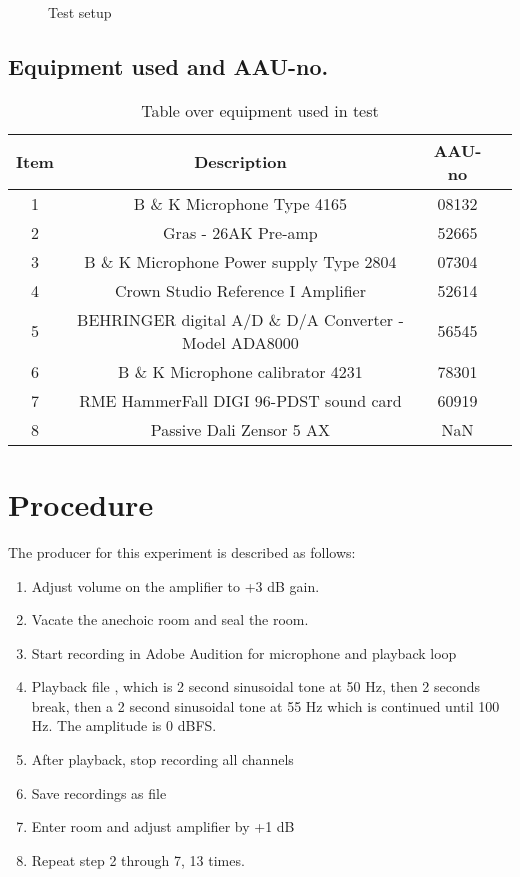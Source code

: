 \begin{figure}[H]
\centering
{}
\scalebox{0.7}{

}
\caption{Test setup}
\label{figure:SpeakertestSetup3}
\end{figure}

\subsection*{Equipment used and AAU-no.}

\begin{table}[H]
\centering
{}
\begin{tabular}{S[table-format=1]ccc} \toprule
    {Item} & {Description} & {AAU-no} \\       &  B \& K Microphone Type 4165  & 08132   \\
    2      &  Gras - 26AK Pre-amp & 52665   \\
    3      &  B \& K Microphone Power supply Type 2804  & 07304   \\
    4      &  Crown Studio Reference I Amplifier & 52614   \\
    5      &  BEHRINGER digital A/D \& D/A Converter - Model ADA8000   & 56545   \\
    6     &  B \& K Microphone calibrator 4231 & 78301   \\
    7     &  RME HammerFall DIGI 96-PDST sound card & 60919  \\
    8     &  Passive Dali Zensor 5 AX & NaN  \\ \bottomrule 
\end{tabular}
\caption{Table over equipment used in test}
\label{tab:UsedEquipment3}
\end{table}



\section{Procedure}\label{sec:SpeakerTestProcedure3}

The producer for this experiment is described as follows:
\begin{enumerate}
\item Adjust volume on the amplifier to +3 dB gain.
\item Vacate the anechoic room and seal the room.
\item Start recording in Adobe Audition for microphone and playback loop
\item Playback file , which is 2 second sinusoidal tone at 50 Hz, then 2 seconds break, then a 2 second sinusoidal tone at 55 Hz which is continued until 100 Hz. The amplitude is 0 dBFS.
\item After playback, stop recording all channels
\item Save recordings as  file
\item Enter room and adjust amplifier by +1 dB
\item Repeat step 2 through 7, 13 times.
\end{enumerate}

